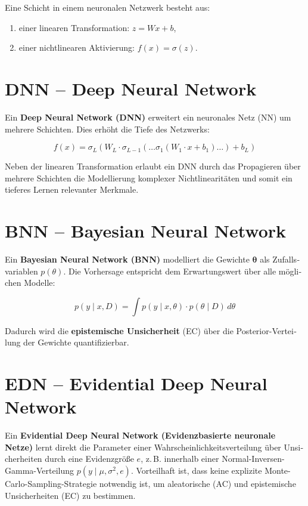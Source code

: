 \begin{otherlanguage}{ngerman}
Eine Schicht in einem neuronalen Netzwerk besteht aus:
\begin{enumerate}
  \item einer linearen Transformation: \( z = Wx + b \),
  \item einer nichtlinearen Aktivierung: \( f(x) = \sigma(z) \).
\end{enumerate}


\section*{DNN – Deep Neural Network}

Ein \textbf{Deep Neural Network (DNN)} erweitert ein neuronales Netz (NN) um mehrere Schichten. Dies erhöht die Tiefe des Netzwerks:

\[
f(x) = \sigma_L\left(W_L \cdot \sigma_{L-1}\left(\ldots \sigma_1\left(W_1 \cdot x + b_1\right) \ldots \right) + b_L\right)
\]

Neben der linearen Transformation erlaubt ein DNN durch das Propagieren über mehrere Schichten die Modellierung komplexer Nichtlinearitäten und somit ein tieferes Lernen relevanter Merkmale.

\section*{BNN – Bayesian Neural Network}

Ein \textbf{Bayesian Neural Network (BNN)} modelliert die Gewichte $\boldsymbol{\theta}$ als Zufallsvariablen $p(\theta)$. Die Vorhersage entspricht dem Erwartungswert über alle möglichen Modelle:

\[
p(y \mid x, D) = \int p(y \mid x, \theta) \cdot p(\theta \mid D) \, d\theta
\]

Dadurch wird die \textbf{epistemische Unsicherheit} (EC) über die Posterior-Verteilung der Gewichte quantifizierbar.

\section*{EDN – Evidential Deep Neural Network}


Ein \textbf{Evidential Deep Neural Network (\gls{Evidenzbasierte neuronale Netze})} lernt direkt die Parameter einer Wahrscheinlichkeitsverteilung über Unsicherheiten durch eine Evidenzgröße $e$, z.\,B. innerhalb einer Normal-Inversen-Gamma-Verteilung $p(y \mid \mu, \sigma^2, e)$. Vorteilhaft ist, dass keine explizite Monte-Carlo-Sampling-Strategie notwendig ist, um aleatorische (AC) und epistemische Unsicherheiten (EC) zu bestimmen.


\end{otherlanguage}
